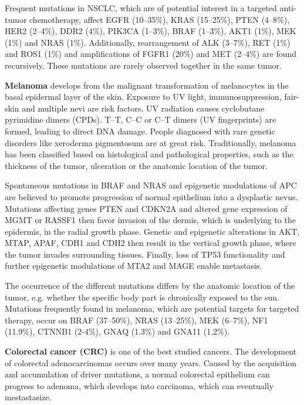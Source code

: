     Frequent  mutations in NSCLC, which are of potential interest in a targeted
    anti-tumor chemotherapy, affect EGFR (10--35\%), KRAS (15--25\%), PTEN
    (4--8\%), HER2 (2--4\%), DDR2 (4\%), PIK3CA (1--3\%), BRAF (1--3\%), AKT1
    (1\%), MEK (1\%) and NRAS (1\%). Additionally, rearrangement of ALK
    (3--7\%), RET (1\%) and ROS1 (1\%) and amplifications of FGFR1 (20\%) and
    MET (2--4\%) are found recursively. These mutations are rarely observed
    together in the same tumor.

    \textbf{Melanoma} develops from the malignant transformation of melanocytes
    in the basal epidermal layer of the skin. Exposure to UV light,
    immunosuppression, fair-skin and multiple nevi are risk factors. UV
    radiation causes cyclobutane pyrimidine dimers (CPDs). T--T, C--C or C--T
    dimers (UV fingerprints) are formed, leading to direct DNA damage. People
    diagnosed with rare genetic disorders like xeroderma pigmentosum are at
    great risk. Traditionally, melanoma has been classified based on
    histological and pathological properties, such as the thickness of the
    tumor, ulceration or the anatomic location of the tumor.

    Spontaneous mutations in BRAF and NRAS and epigenetic modulations of APC are
    believed to promote progression of normal epithelium into a dysplastic
    nevus. Mutations affecting genes PTEN and CDKN2A and altered gene expression
    of MGMT or RASSF1 then favor invasion of the dermis, which is underlying to
    the epidermis, in the radial growth phase. Genetic and epigenetic
    alterations in AKT, MTAP, APAF, CDH1 and CDH2 then result in the vertical
    growth phase, where the tumor invades surrounding tissues. Finally, loss of
    TP53 functionality and further epigenetic modulations of MTA2 and MAGE
    enable metastasis.

    The occurrence of the different mutations differs by the anatomic location
    of the tumor, e.g. whether the specific body part is chronically exposed to
    the sun. Mutations frequently found in melanoma, which are potential targets
    for targeted therapy, occur on BRAF (37--50\%), NRAS (13--25\%), MEK
    (6--7\%), NF1 (11.9\%), CTNNB1 (2-4\%), GNAQ (1.3\%) and GNA11 (1.2\%).

    \textbf{Colorectal cancer (CRC)} is one of the best studied cancers. The
    development of colorectal adenocarcinomas occurs over many years. Caused by
    the acquisition and accumulation of driver mutations, a normal colorectal
    epithelium can progress to adenoma, which develops into carcinoma, which can
    eventually mestastasize.


